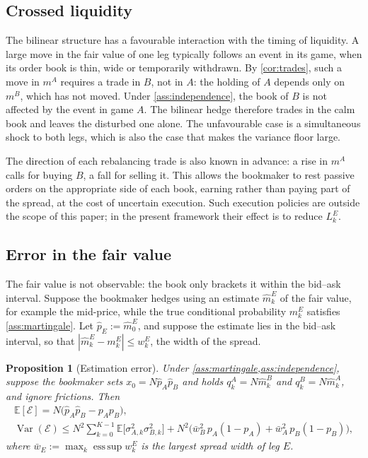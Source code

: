 \documentclass[11pt,a4paper]{article}
\theoremstyle{plain}
\newtheorem{proposition}[theorem]{Proposition}
\theoremstyle{definition}
\theoremstyle{remark}
\newcommand{\E}{\mathbb{E}}
\newcommand{\1}{\mathbf{1}}
\newcommand{\Var}{\operatorname{Var}}
\begin{document}
\subsection{Crossed liquidity}

The bilinear structure has a favourable interaction with the timing of liquidity. A large move in the fair value of one leg typically follows an event in its game, when its order book is thin, wide or temporarily withdrawn. By \cref{cor:trades}, such a move in $m^A$ requires a trade in $B$, not in $A$: the holding of $A$ depends only on $m^B$, which has not moved. Under \cref{ass:independence}, the book of $B$ is not affected by the event in game $A$. The bilinear hedge therefore trades in the calm book and leaves the disturbed one alone. The unfavourable case is a simultaneous shock to both legs, which is also the case that makes the variance floor large.

The direction of each rebalancing trade is also known in advance: a rise in $m^A$ calls for buying $B$, a fall for selling it. This allows the bookmaker to rest passive orders on the appropriate side of each book, earning rather than paying part of the spread, at the cost of uncertain execution. Such execution policies are outside the scope of this paper; in the present framework their effect is to reduce $L^E_k$.

\subsection{Error in the fair value}

The fair value is not observable: the book only brackets it within the bid--ask interval. Suppose the bookmaker hedges using an estimate $\hat m^E_k$ of the fair value, for example the mid-price, while the true conditional probability $m^E_k$ satisfies \cref{ass:martingale}. Let $\hat p_E := \hat m^E_0$, and suppose the estimate lies in the bid--ask interval, so that $|\hat m^E_k - m^E_k|\leq w^E_k$, the width of the spread.

\begin{proposition}[Estimation error]
\label{prop:estimation}
Under \cref{ass:martingale,ass:independence}, suppose the bookmaker sets $x_0 = N\hat p_A\hat p_B$ and holds $q^A_k = N\hat m^B_k$ and $q^B_k = N\hat m^A_k$, and ignore frictions. Then
\[
\begin{gathered}
\E[\mathcal{E}] = N\bigl(\hat p_A\hat p_B - p_Ap_B\bigr),\\
\Var(\mathcal{E}) \leq N^2\sum_{k=0}^{K-1}\E\bigl[\sigma^2_{A,k}\sigma^2_{B,k}\bigr] + N^2\bigl(\bar w_B^2\,p_A(1-p_A) + \bar w_A^2\,p_B(1-p_B)\bigr),
\end{gathered}
\]
where $\bar w_E := \max_k\operatorname{ess\,sup}w^E_k$ is the largest spread width of leg $E$.
\end{proposition}
\end{document}
